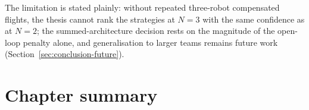 The limitation is stated plainly: without repeated three-robot compensated flights, the thesis
cannot rank the strategies at $N=3$ with the same confidence as at $N=2$; the summed-architecture
decision rests on the magnitude of the open-loop penalty alone, and generalisation
to larger teams remains future work (Section~\ref{sec:conclusion-future}).

\section{Chapter summary}
\label{sec:res3-summary}

